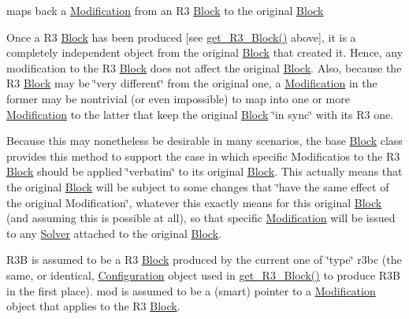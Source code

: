 maps back a \mbox{\hyperlink{class_s_m_spp__di__unipi__it_1_1_modification}{Modification}} from an R3 \mbox{\hyperlink{class_s_m_spp__di__unipi__it_1_1_block}{Block}} to the original \mbox{\hyperlink{class_s_m_spp__di__unipi__it_1_1_block}{Block}} 

Once a R3 \mbox{\hyperlink{class_s_m_spp__di__unipi__it_1_1_block}{Block}} has been produced \mbox{[}see \mbox{\hyperlink{class_s_m_spp__di__unipi__it_1_1_block_a2e682f5c0d4a74503c0cb5ab38fb6428}{get\+\_\+\+R3\+\_\+\+Block()}} above\mbox{]}, it is a completely independent object from the original \mbox{\hyperlink{class_s_m_spp__di__unipi__it_1_1_block}{Block}} that created it. Hence, any modification to the R3 \mbox{\hyperlink{class_s_m_spp__di__unipi__it_1_1_block}{Block}} does not affect the original \mbox{\hyperlink{class_s_m_spp__di__unipi__it_1_1_block}{Block}}. Also, because the R3 \mbox{\hyperlink{class_s_m_spp__di__unipi__it_1_1_block}{Block}} may be \char`\"{}very different\char`\"{} from the original one, a \mbox{\hyperlink{class_s_m_spp__di__unipi__it_1_1_modification}{Modification}} in the former may be nontrivial (or even impossible) to map into one or more \mbox{\hyperlink{class_s_m_spp__di__unipi__it_1_1_modification}{Modification}} to the latter that keep the original \mbox{\hyperlink{class_s_m_spp__di__unipi__it_1_1_block}{Block}} \char`\"{}in sync\char`\"{} with its R3 one.

Because this may nonetheless be desirable in many scenarios, the base \mbox{\hyperlink{class_s_m_spp__di__unipi__it_1_1_block}{Block}} class provides this method to support the case in which specific Modificatios to the R3 \mbox{\hyperlink{class_s_m_spp__di__unipi__it_1_1_block}{Block}} should be applied \char`\"{}verbatim\char`\"{} to its original \mbox{\hyperlink{class_s_m_spp__di__unipi__it_1_1_block}{Block}}. This actually means that the original \mbox{\hyperlink{class_s_m_spp__di__unipi__it_1_1_block}{Block}} will be subject to some changes that \char`\"{}have the same effect of the original Modification\char`\"{}, whatever this exactly means for this original \mbox{\hyperlink{class_s_m_spp__di__unipi__it_1_1_block}{Block}} (and assuming this is possible at all), so that specific \mbox{\hyperlink{class_s_m_spp__di__unipi__it_1_1_modification}{Modification}} will be issued to any \mbox{\hyperlink{class_s_m_spp__di__unipi__it_1_1_solver}{Solver}} attached to the original \mbox{\hyperlink{class_s_m_spp__di__unipi__it_1_1_block}{Block}}.

R3B is assumed to be a R3 \mbox{\hyperlink{class_s_m_spp__di__unipi__it_1_1_block}{Block}} produced by the current one of \char`\"{}type\char`\"{} r3bc (the same, or identical, \mbox{\hyperlink{class_s_m_spp__di__unipi__it_1_1_configuration}{Configuration}} object used in \mbox{\hyperlink{class_s_m_spp__di__unipi__it_1_1_block_a2e682f5c0d4a74503c0cb5ab38fb6428}{get\+\_\+\+R3\+\_\+\+Block()}} to produce R3B in the first place). mod is assumed to be a (smart) pointer to a \mbox{\hyperlink{class_s_m_spp__di__unipi__it_1_1_modification}{Modification}} object that applies to the R3 \mbox{\hyperlink{class_s_m_spp__di__unipi__it_1_1_block}{Block}}.

